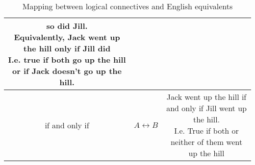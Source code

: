 \begin{table}[htbp]
\begin{tabular}{|c|c|c|}
{		so did Jill.                                                                         \\
		Equivalently, Jack went up the hill only if Jill did                                 \\
			I.e. true if both go up the hill or if Jack doesn't go up the
		hill.}                                                                               \\
		\hline
		if and only if & $A \leftrightarrow B$ & \shortstack{Jack went up the hill if and
			only if Jill
		went up the hill.                                                                    \\
		I.e. True if both or neither of them went up the hill}                               \\
		\hline
	\end{tabular}
	\caption{Mapping between logical connectives and English equivalents}
	\label{tab:eng_connectives}
\end{table}


